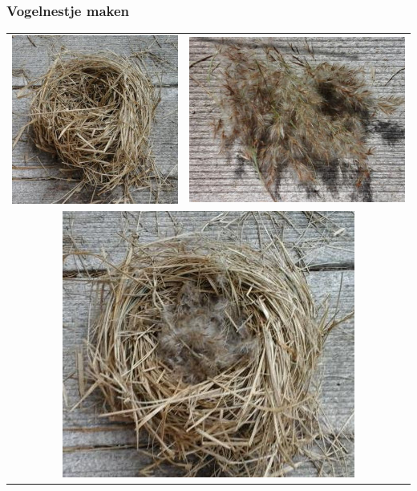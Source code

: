 \documentclass[a4paper, handout]{beamer}
\begin{document}
\begin{frame}
	\frametitle{Vogelnestje maken}
	\begin{tabular}{ c c }
		\includegraphics[scale=0.3]{nestje-1}
		&
		\includegraphics[scale=0.3]{nestje-2}
		\\
		\multicolumn{2}{c}{ \includegraphics[scale=0.3]{nestje-3}}
		\\
	\end{tabular}
\end{frame}
\end{document}
